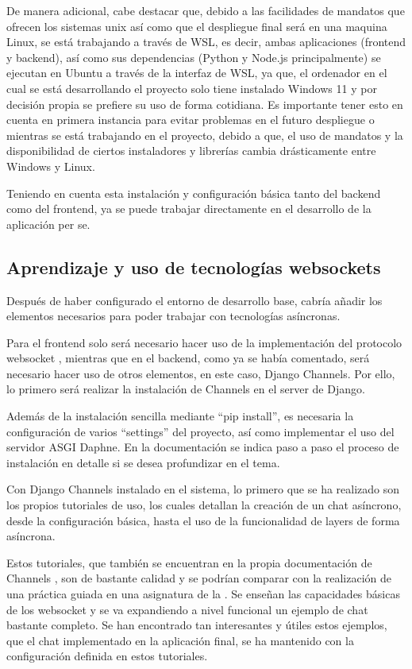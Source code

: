 De manera adicional, cabe destacar que, debido a las facilidades de mandatos que ofrecen los sistemas unix así como que el despliegue
final será en una maquina Linux, se está trabajando a través de WSL, es decir,
ambas aplicaciones (frontend y backend), así como sus dependencias (Python y Node.js principalmente) se ejecutan en Ubuntu a través de la interfaz
de WSL, ya que, el ordenador en el cual se está desarrollando el proyecto solo tiene instalado Windows 11 y por decisión propia se prefiere su uso de forma
cotidiana. Es importante tener esto en cuenta en primera instancia para evitar problemas en el futuro despliegue o mientras se está trabajando en el proyecto,
debido a que, el uso de mandatos y la disponibilidad de ciertos instaladores y librerías cambia drásticamente entre Windows y Linux.

Teniendo en cuenta esta instalación y configuración básica tanto del backend como del frontend, ya se puede trabajar directamente en el desarrollo de
la aplicación per se.

\subsection{Aprendizaje y uso de tecnologías websockets} 

Después de haber configurado el entorno de desarrollo base, cabría añadir los elementos necesarios para poder 
trabajar con tecnologías asíncronas.

Para el frontend solo será necesario hacer uso de la implementación del protocolo websocket \cite{websocketMDN}, mientras que en el 
backend, como ya se había comentado, será necesario hacer uso de otros elementos, en este caso, Django Channels. 
Por ello, lo primero será realizar la instalación de Channels en el server de Django.

Además de la instalación sencilla mediante ``pip install'', es necesaria la configuración de varios ``settings'' del proyecto, así
como implementar el uso del servidor ASGI Daphne. En la documentación \cite{djangoChannelsInstall} se indica paso a paso el proceso 
de instalación en detalle si se desea profundizar en el tema.

Con Django Channels instalado en el sistema, lo primero que se ha realizado son los propios tutoriales de uso, los cuales detallan 
la creación de un chat asíncrono, desde la configuración básica, hasta el uso de la funcionalidad de layers de forma asíncrona.

Estos tutoriales, que también se encuentran en la propia documentación de Channels \cite{djangoChannelsTutorial}, son 
de bastante calidad y se podrían comparar con la realización de una práctica guiada en una asignatura de la 
\escuelalargo. Se enseñan las capacidades básicas de los websocket y se va expandiendo a nivel funcional un ejemplo
de chat bastante completo. Se han encontrado tan interesantes y útiles estos ejemplos, que el chat implementado
en la aplicación final, se ha mantenido con la configuración definida en estos tutoriales.

